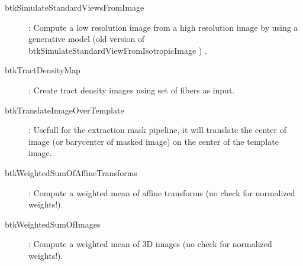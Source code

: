 \begin{description}
\item[btkSimulateStandardViewsFromImage]: Compute a low resolution image from a high resolution image by using a generative model (old version of btkSimulateStandardViewFromIsotropicImage )
.%
\item[btkTractDensityMap]: Create tract density images using set of fibers as input.
\item[btkTranslateImageOverTemplate]: Usefull for the extraction mask pipeline, it will translate the center of image (or barycenter of masked image) on the center of the template image.
\item[btkWeightedSumOfAffineTransforms]: Compute a weighted mean of affine transforms (no check for normalized weights!).
\item[btkWeightedSumOfImages]: Compute a weighted mean of 3D images (no check for normalized weights!).



\end{description}
